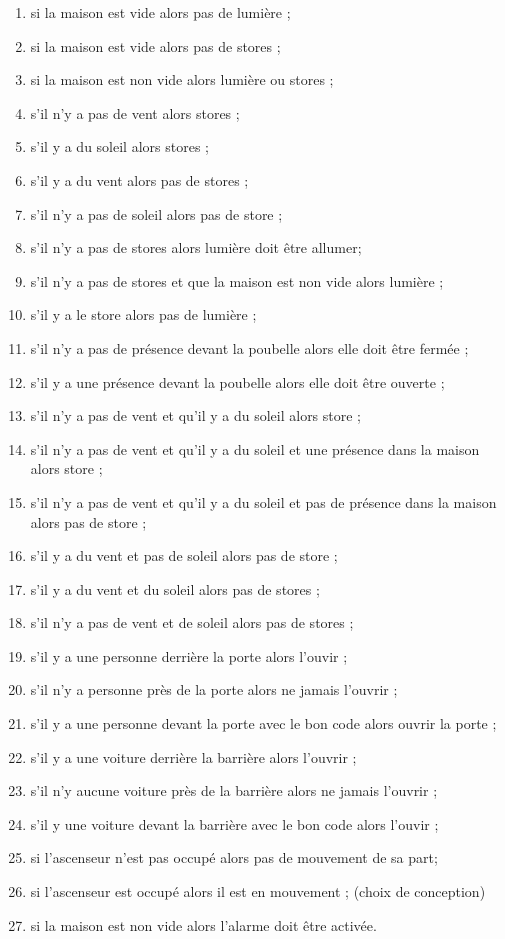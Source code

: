 \documentclass{svjour3}
\begin{document}
\begin{enumerate}

 \item si la maison est vide alors pas de lumière ;
 \item si la maison est vide alors pas de stores ;
 \item si la maison est non vide alors lumière ou stores ;
 \item s'il n'y a pas de vent alors stores ;
 \item s'il y a du soleil alors stores ;
 \item s'il y a du vent alors pas de stores ;
 \item s'il n'y a pas de soleil alors pas de store ;
 \item s'il n'y a pas de stores alors lumière doit être allumer;
 \item s'il n'y a pas de stores et que la maison est non vide alors lumière ;
 \item s'il y a le store alors pas de lumière ;
 \item s'il n'y a pas de  présence devant la poubelle alors elle doit être fermée ;
 \item s'il y a une présence devant la poubelle alors elle doit être ouverte ;
 \item s'il n'y a pas de vent et qu'il y a du soleil alors store ;
 \item s'il n'y a pas de vent et qu'il y a du soleil et une présence dans la maison alors store ;
 \item s'il n'y a pas de vent et qu'il y a du soleil et pas de présence dans la maison alors pas de store ;
 \item s'il y a du vent et pas de soleil alors pas de store ;
 \item s'il y a du vent et du soleil alors pas de stores ;
 \item s'il n'y a pas de vent et de soleil alors pas de stores ;
 \item s'il y a une personne derrière la porte alors l'ouvir ; 
 \item s'il n'y a personne près de la porte alors ne jamais l'ouvrir ;
 \item s'il y a une personne devant la porte avec le bon code alors ouvrir la porte ;
 \item s'il y a une voiture derrière la barrière alors l'ouvrir ;
 \item s'il n'y aucune voiture près de la barrière alors ne jamais l'ouvrir ;
 \item s'il y une voiture devant la barrière avec le bon code alors l'ouvir ; 
 \item si l'ascenseur n'est pas occupé alors pas de mouvement de sa part;
 \item si l'ascenseur est occupé alors il est en mouvement ; (choix de conception)
 \item si la maison est non vide alors l'alarme doit être activée.
	
\end{enumerate}
\end{document}
